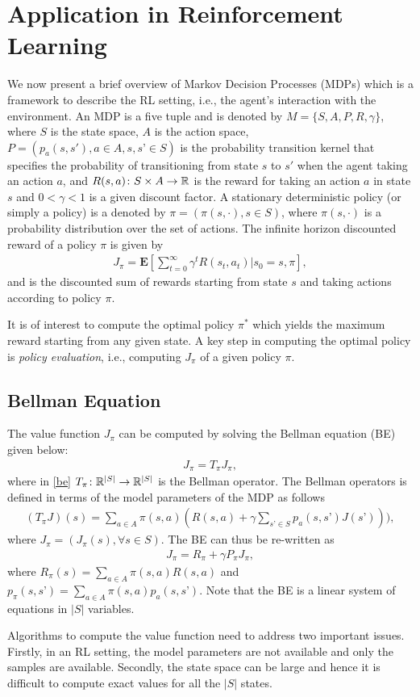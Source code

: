 \section{Application in Reinforcement Learning}
We now present a brief overview of Markov Decision Processes (MDPs) which is a framework to describe the RL setting, i.e., the agent's interaction with the environment. An MDP is a five tuple and is denoted by $M=\{S,A,P,R,\gamma\}$, where $S$ is the state space, $A$ is the action space, $P=(p_a(s,s'),a\in A,s,s’\in S)$ is the probability transition kernel that specifies the probability of transitioning from state $s$ to $s'$ when the agent taking an action $a$, and $R(s,a)\colon S\times A\rightarrow \mathbb{R}$ is the reward for taking an action $a$ in state $s$ and $0<\gamma<1$ is a given discount factor. A stationary deterministic policy (or simply a policy) is a denoted by $\pi=(\pi(s,\cdot),s\in S)$, where $\pi(s,\cdot)$ is a probability distribution over the set of actions. The infinite horizon discounted reward of a policy $\pi$ is given by
\begin{align}
J_\pi=\mathbf{E}[\sum_{t=0}^\infty \gamma^t R(s_t,a_t)| s_0=s, \pi],
\end{align}
and is the discounted sum of rewards starting from state $s$ and taking actions according to policy $\pi$.\par
It is of interest to compute the optimal policy $\pi^*$ which yields the maximum reward starting from any given state. A key step in computing the optimal policy is \emph{policy evaluation}, i.e.,  computing $J_\pi$ of a given policy $\pi$.\par
\subsection{Bellman Equation}
The value function $J_\pi$ can be computed by solving the Bellman equation (BE) given below:
\begin{align}\label{be}
J_\pi=T_\pi J_\pi,
\end{align}
where in \eqref{be} $T_\pi\colon \mathbb{R}^{|S|}\rightarrow \mathbb{R}^{|S|}$ is the Bellman operator. The Bellman operators is defined in terms of the model parameters of the MDP as follows
\begin{align}\label{bo}
(T_\pi J)(s)=\sum_{a\in A}\pi(s,a)(R(s,a)+\gamma \sum_{s’\in S}p_a(s,s’) J(s’))),
\end{align}
where $J_\pi=(J_\pi(s),\forall s\in S)$. The BE can thus be re-written as 
\begin{align}\label{be}
J_\pi=R_\pi+\gamma P_\pi J_\pi,
\end{align}
where $R_\pi(s)=\sum_{a\in A}\pi(s,a) R(s,a)$ and $p_\pi(s,s’)=\sum_{a\in A}\pi(s,a)p_a(s,s’)$. Note that the BE is a linear system of equations in $|S|$ variables.\par
Algorithms to compute the value function need to address two important issues. Firstly, in an RL setting, the model parameters are not available and only the samples are available. Secondly, the state space can be large and hence it is difficult to compute exact values for all the $|S|$ states.
